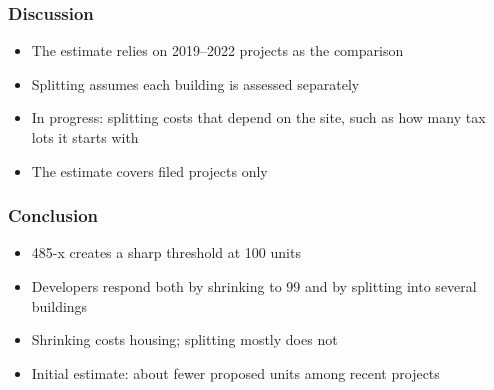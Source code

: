 \begin{frame}
    \frametitle{Discussion}
    \begin{itemize}[itemsep=0.5em]
        \item The estimate relies on 2019--2022 projects as the comparison
        \item Splitting assumes each building is assessed separately
        \item In progress: splitting costs that depend on the site, such as how many tax lots it starts with
        \item The estimate covers filed projects only
    \end{itemize}
\end{frame}

\begin{frame}
    \frametitle{Conclusion}
    \begin{itemize}[itemsep=0.5em]
        \item 485-x creates a sharp threshold at 100 units
        \item Developers respond both by shrinking to 99 and by splitting into several buildings
        \item Shrinking costs housing; splitting mostly does not
        \item Initial estimate: about \MainUnitsLost{} fewer proposed units among recent projects
    \end{itemize}
\end{frame}
